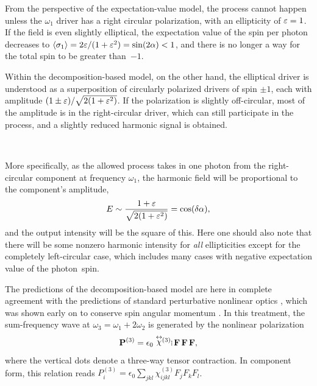 From the perspective of the expectation-value model, the process cannot happen unless the $\omega_1$ driver has a right circular polarization, with an ellipticity of $\varepsilon=1$. If the field is even slightly elliptical, the expectation value of the spin per photon decreases to $\langle\sigma_1\rangle  =2\varepsilon/(1+\varepsilon^2) =\sin(2\alpha) <1$, and there is no longer a way for the total spin to be greater than~$-1$.

Within the decomposition-based model, on the other hand, the elliptical driver is understood as a superposition of circularly polarized drivers of spin $\pm1$, each with amplitude $(1\pm\varepsilon)/\sqrt{2(1+\varepsilon^2)}$. If the polarization is slightly off-circular, most of the amplitude is in the right-circular driver, which can still participate in the process, and a slightly reduced harmonic signal is obtained. 

$\quad$

More specifically, as the allowed process takes in one photon from the right-circular component at frequency $\omega_1$, the harmonic field will be proportional to the component's amplitude,
\begin{equation}
E\sim\frac{1+\varepsilon}{\sqrt{2(1+\varepsilon^2)}}=\cos(\delta\alpha),
\end{equation}
and the output intensity will be the square of this. Here one should also note that there will be some nonzero harmonic intensity for \textit{all} ellipticities except for the completely left-circular case, which includes many cases with negative expectation value of the \mbox{photon spin}.



The predictions of the decomposition-based model are here in complete agreement with the predictions of standard perturbative nonlinear optics \cite{VectorFourWaveMixing, AgrawalFiberOptics}, which was shown early on to conserve spin angular momentum \cite{BloembergenConservationLaws, SelectionRulesNonlinearOptics}. In this treatment, the sum-frequency wave at $\omega_3=\omega_1+2\omega_2$ is generated by the nonlinear polarization 
\begin{equation}
\vbP^{(3)}=\epsilon_0\chit
\tdots
\vbf\,\vbf\,\vbf,
\label{e8-nonlinear-polarization-definition}
\end{equation}
where the vertical dots denote a three-way tensor contraction. In component form, this relation reads $P^{(3)}_i=\epsilon_0 \sum_{jkl} \chi^{(3)}_{ijkl} F_jF_kF_l$.




